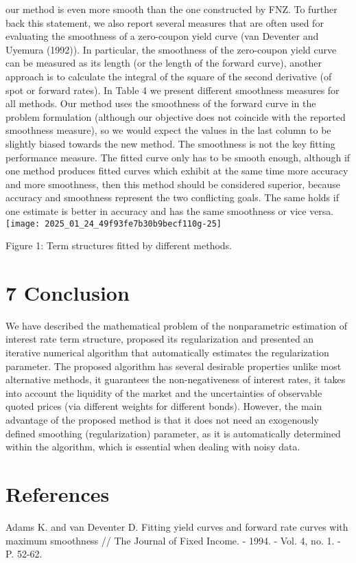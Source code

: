 \documentclass[10pt]{article}
\begin{document}
our method is even more smooth than the one constructed by FNZ. To further back this statement, we also report several measures that are often used for evaluating the smoothness of a zero-coupon yield curve (van Deventer and Uyemura (1992)). In particular, the smoothness of the zero-coupon yield curve can be measured as its length (or the length of the forward curve), another approach is to calculate the integral of the square of the second derivative (of spot or forward rates). In Table 4 we present different smoothness measures for all methods. Our method uses the smoothness of the forward curve in the problem formulation (although our objective does not coincide with the reported smoothness measure), so we would expect the values in the last column to be slightly biased towards the new method. The smoothness is not the key fitting performance measure. The fitted curve only has to be smooth enough, although if one method produces fitted curves which exhibit at the same time more accuracy and more smoothness, then this method should be considered superior, because accuracy and smoothness represent the two conflicting goals. The same holds if one estimate is better in accuracy and has the same smoothness or vice versa.\\
\texttt{[image: 2025\_01\_24\_49f93fe7b30b9becf110g-25]}

Figure 1: Term structures fitted by different methods.

\section*{7 Conclusion}
We have described the mathematical problem of the nonparametric estimation of interest rate term structure, proposed its regularization and presented an iterative numerical algorithm that automatically estimates the regularization parameter. The proposed algorithm has several desirable properties unlike most alternative methods, it guarantees the non-negativeness of interest rates, it takes into account the liquidity of the market and the uncertainties of observable quoted prices (via different weights for different bonds). However, the main advantage of the proposed method is that it does not need an exogenously defined smoothing (regularization) parameter, as it is automatically determined within the algorithm, which is essential when dealing with noisy data.

\section*{References}
Adams K. and van Deventer D. Fitting yield curves and forward rate curves with maximum smoothness // The Journal of Fixed Income. - 1994. - Vol. 4, no. 1. - P. 52-62.
\end{document}

